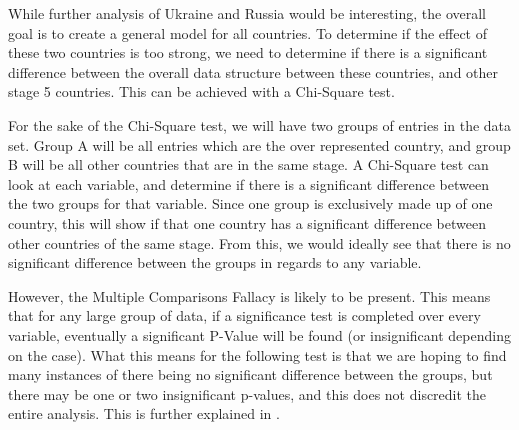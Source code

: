\documentclass{article} %
\begin{document}
While further analysis of Ukraine and Russia would be interesting, the overall goal is to create a general model for all countries. To determine if the effect of these two countries is too strong, we need to determine if there is a significant difference between the overall data structure between these countries, and other stage 5 countries. This can be achieved with a Chi-Square test.

For the sake of the Chi-Square test, we will have two groups of entries in the data set. Group A will be all entries which are the over represented country, and group B will be all other countries that are in the same stage. A Chi-Square test can look at each variable, and determine if there is a significant difference between the two groups for that variable. Since one group is exclusively made up of one country, this will show if that one country has a significant difference between other countries of the same stage. From this, we would ideally see that there is no significant difference between the groups in regards to any variable. 

However, the Multiple Comparisons Fallacy is likely to be present. This means that for any large group of data, if a significance test is completed over every variable, eventually a significant P-Value will be found (or insignificant depending on the case). What this means for the following test is that we are hoping to find many instances of there being no significant difference between the groups, but there may be one or two insignificant p-values, and this does not discredit the entire analysis. This is further explained in \cite{Fallacy}.
\end{document}
